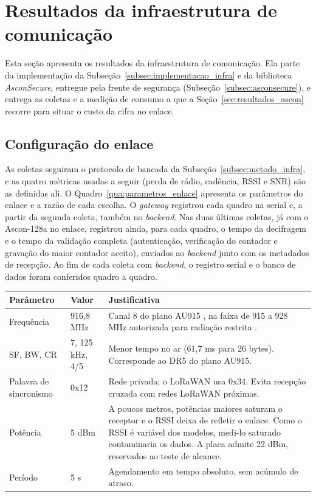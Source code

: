 \section{Resultados da infraestrutura de comunicação}
\label{sec:resultados_infra}

Esta seção apresenta os resultados da infraestrutura de comunicação. Ela parte da implementação da Subseção~\ref{subsec:implementacao_infra} e da biblioteca \textit{AsconSecure}, entregue pela frente de segurança (Subseção~\ref{subsec:asconsecure}), e entrega as coletas e a medição de consumo a que a Seção~\ref{sec:resultados_ascon} recorre para situar o custo da cifra no enlace.

\subsection{Configuração do enlace}

As coletas seguiram o protocolo de bancada da Subseção~\ref{subsec:metodo_infra}, e as quatro métricas usadas a seguir (perda de rádio, cadência, RSSI e SNR) são as definidas ali. O Quadro~\ref{qua:parametros_enlace} apresenta os parâmetros do enlace e a razão de cada escolha. O \textit{gateway} registrou cada quadro na serial e, a partir da segunda coleta, também no \textit{backend}. Nas duas últimas coletas, já com o Ascon-128a no enlace, registrou ainda, para cada quadro, o tempo da decifragem e o tempo da validação completa (autenticação, verificação do contador e gravação do maior contador aceito), enviados ao \textit{backend} junto com os metadados de recepção. Ao fim de cada coleta com \textit{backend}, o registro serial e o banco de dados foram conferidos quadro a quadro.

\begin{quadro}[htb]
\centering
\caption{Parâmetros do enlace e justificativas}
\label{qua:parametros_enlace}
\small
\begin{tabular}{p{3cm}p{2cm}p{}}
\hline
\textbf{Parâmetro} & \textbf{Valor} & \textbf{Justificativa} \\
\hline
Frequência & 916,8 MHz & Canal 8 do plano AU915 \cite{lorawan_rp002}, na faixa de 915 a 928 MHz autorizada para radiação restrita \cite{anatel_radiacao_restrita}. \\
SF, BW, CR & 7, 125 kHz, 4/5 & Menor tempo no ar (61,7 ms para 26 bytes). Corresponde ao DR5 do plano AU915. \\
Palavra de sincronismo & 0x12 & Rede privada; o LoRaWAN usa 0x34. Evita recepção cruzada com redes LoRaWAN próximas. \\
Potência & 5 dBm & A poucos metros, potências maiores saturam o receptor e o RSSI deixa de refletir o enlace. Como o RSSI é variável dos modelos, medi-lo saturado contaminaria os dados. A placa admite 22 dBm, reservados ao teste de alcance. \\
Período & 5 s & Agendamento em tempo absoluto, sem acúmulo de atraso. \\
\hline
\end{tabular}
\end{quadro}


